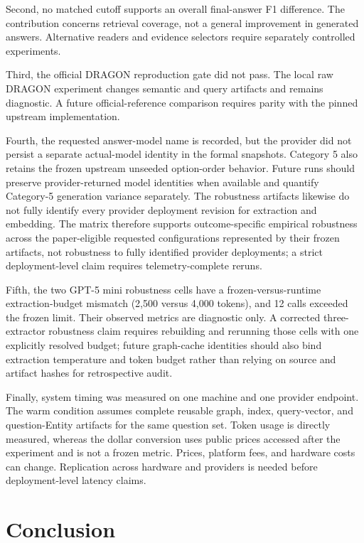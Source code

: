 \documentclass[10pt,twocolumn]{article}
\begin{document}
Second, no matched cutoff supports an overall final-answer F1 difference. The
contribution concerns retrieval coverage, not a general improvement in
generated answers. Alternative readers and evidence selectors require
separately controlled experiments.

Third, the official DRAGON reproduction gate did not pass. The local raw
DRAGON experiment changes semantic and query artifacts and remains diagnostic.
A future official-reference comparison requires parity with the pinned
upstream implementation.

Fourth, the requested answer-model name is recorded, but the provider did not
persist a separate actual-model identity in the formal snapshots. Category 5
also retains the frozen upstream unseeded option-order behavior. Future runs
should preserve provider-returned model identities when available and quantify
Category-5 generation variance separately. The robustness artifacts likewise
do not fully identify every provider deployment revision for extraction and
embedding. The matrix therefore supports outcome-specific empirical
robustness across the paper-eligible requested configurations represented by
their frozen artifacts, not robustness to fully identified provider
deployments; a strict deployment-level claim requires telemetry-complete
reruns.

Fifth, the two GPT-5 mini robustness cells have a frozen-versus-runtime
extraction-budget mismatch (2,500 versus 4,000 tokens), and 12 calls exceeded
the frozen limit. Their observed metrics are diagnostic only. A corrected
three-extractor robustness claim requires rebuilding and rerunning those cells
with one explicitly resolved budget; future graph-cache identities should also
bind extraction temperature and token budget rather than relying on source and
artifact hashes for retrospective audit.

Finally, system timing was measured on one machine and one provider endpoint.
The warm condition assumes complete reusable graph, index, query-vector, and
question-Entity artifacts for the same question set. Token usage is directly
measured, whereas the dollar conversion uses public prices accessed after the
experiment and is not a frozen metric. Prices, platform fees, and hardware
costs can change. Replication across hardware and providers is needed before
deployment-level latency claims.

\section{Conclusion}
\end{document}
